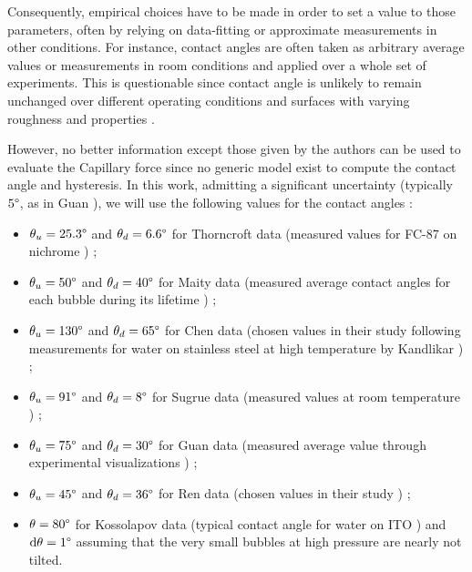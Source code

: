 Consequently, empirical choices have to be made in order to set a value to those parameters, often by relying on data-fitting or approximate measurements in other conditions. For instance, contact angles are often taken as arbitrary average values \cite{ren_development_2020} or measurements in room conditions \cite{sugrue_modified_2016} and applied over a whole set of experiments. This is questionable since contact angle is unlikely to remain unchanged over different operating conditions and surfaces with varying roughness and properties \cite{song_temperature_2021}.

However, no better information except those given by the authors can be used to evaluate the Capillary force since no generic model exist to compute the contact angle and hysteresis. In this work, admitting a significant uncertainty (typically $5\degree$, as in Guan \cite{guan_bubble_2015}), we will use the following values for the contact angles :


\begin{itemize}
\item $\theta_{u}=25.3\degree$ and $\theta_{d} = 6.6\degree$ for Thorncroft data (measured values for FC-87 on nichrome \cite{thorncroft_bubble_2001}) ;
\item $\theta_{u} = 50\degree$ and $\theta_{d} = 40\degree$ for Maity data (measured average contact angles for each bubble during its lifetime \cite{maity_effect_2000}) ;
\item $\theta_{u} = 130\degree$ and $\theta_{d} = 65\degree$ for Chen data (chosen values in their study following measurements for water on stainless steel at high temperature by Kandlikar \etal \cite{kandlikar_contact_2002}) ;
\item $\theta_{u}=91\degree$ and $\theta_{d} = 8\degree$ for Sugrue data (measured values at room temperature \cite{sugrue_effects_2012}) ;
\item $\theta_{u} = 75\degree$ and $\theta_{d} = 30\degree$ for Guan data (measured average value through experimental visualizations \cite{guan_bubble_2015}) ;
\item $\theta_{u} = 45\degree$ and $\theta_{d} = 36\degree$ for Ren data (chosen values in their study \cite{ren_development_2020}) ;
\item $\theta = 80 \degree$ for Kossolapov data (typical contact angle for water on ITO \cite{kossolapov_experimental_2021}) and $\mathrm{d}\theta=1\degree$ assuming that the very small bubbles at high pressure are nearly not tilted.
\end{itemize}


